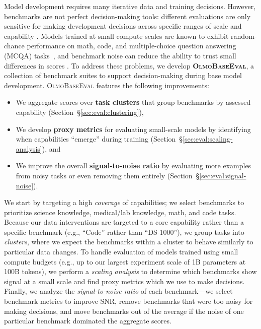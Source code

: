\documentclass[table]{ai2style/ai2}
\newcommand{\olmothreeeval}{\textsc{OlmoBaseEval}\xspace}
\begin{document}
Model development requires many iterative data and training decisions.
However, benchmarks are not perfect decision-making tools: different evaluations are only sensitive for making development decisions across specific ranges of scale and capability \citep{magnusson2025datadecidepredictbestpretraining}.
Models trained at small compute scales are known to exhibit random-chance performance on math, code, and multiple-choice question answering (MCQA) tasks~\citep{wei2022emergent,olmes}, and benchmark noise can reduce the ability to trust small differences in scores \citep{heineman2025signalnoiseframeworkreducing}.
To address these problems, we develop {\bf \olmothreeeval}, a collection of benchmark suites to support decision-making during base model development. \olmothreeeval features the following improvements:
\begin{itemize}
    \item We aggregate scores over {\bf task clusters} that group benchmarks by assessed capability (Section~\S\ref{sec:eval:clustering}),
    \item We develop {\bf proxy metrics} for evaluating small-scale models by identifying when capabilities ``emerge'' during training (Section~\S\ref{sec:eval:scaling-analysis}), and
    \item We improve the overall {\bf signal-to-noise ratio} by evaluating more examples from noisy tasks or even removing them entirely (Section~\S\ref{sec:eval:signal-noise}).
\end{itemize}

We start by targeting a high \textit{coverage} of capabilities; we select benchmarks to prioritize science knowledge, medical/lab knowledge, math, and code tasks.
Because our data interventions are targeted to a core capability rather than a specific benchmark (e.g., ``Code'' rather than ``DS-1000''), we group tasks into \textit{clusters}, where we expect the benchmarks within a cluster to behave similarly to particular data changes.
To handle evaluation of models trained using small compute budgets (e.g., up to our largest experiment scale of 1B parameters at 100B tokens), we perform a \textit{scaling analysis} to determine which benchmarks show signal at a small scale and find proxy metrics which we use to make decisions. Finally, we analyze the \textit{signal-to-noise ratio} of each benchmark---we select benchmark metrics to improve SNR, remove benchmarks that were too noisy for making decisions, and move benchmarks out of the average if the noise of one particular benchmark dominated the aggregate scores.
\end{document}
